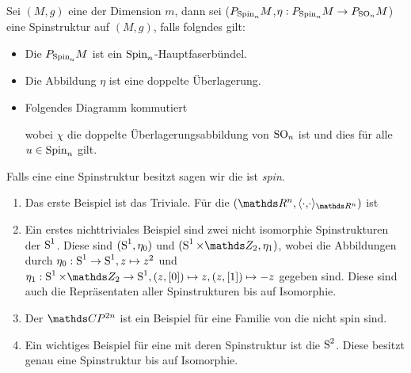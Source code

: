 \begin{Def}[Spinstruktur]
	Sei $(M,g)$ eine \RMF der Dimension $m$, dann sei
	 ($P_{\operatorname{Spin}_{ n }}M$,$\eta : P_{\operatorname{Spin}_{ n }}M \rightarrow P_{\operatorname{SO}_{ n }}M$) eine Spinstruktur auf $(M,g)$, falls folgndes gilt:
	 \begin{itemize}
	 	\item Die \mfg $P_{\operatorname{Spin}_{ n }}M$ ist ein $\operatorname{Spin}_{ n }$-Hauptfaserbündel.
	 	\item Die Abbildung $\eta$ ist eine doppelte Überlagerung.
	 	\item Folgendes Diagramm kommutiert\\
		 	\begin{center}
			 \end{center}
			wobei $\chi$ die doppelte Überlagerungsabbildung von $\operatorname{SO}_{ n }$ ist
			und dies für alle $u \in \operatorname{Spin}_{ n }$ gilt.
	 \end{itemize}
	 Falls eine \RMF eine Spinstruktur besitzt sagen wir die \mfg ist \textit{spin}.
	

\end{Def}

\begin{Bsp}
	\begin{enumerate}[(1)]
		\item Das erste Beispiel ist das Triviale. Für die \RMF $(\R^n, \scdots_{\R^n})$ ist 
		\item Ein erstes nichttriviales Beispiel sind zwei nicht
		isomorphie Spinstrukturen der $\operatorname{S}^1$. Diese sind $(\operatorname{S}^1 , \eta_0)$ und $(\Sp^1 \times \Z_2 , \eta_1)$, wobei die Abbildungen durch $\eta_0 : \operatorname{S}^1 \rightarrow \operatorname{S}^1 , z \mapsto z^2$ und $\eta_1 : \Sp^1 \times \Z_2 \rightarrow \Sp^1 , (z,[0]) \mapsto z , (z,[1]) \mapsto -z$ gegeben sind. Diese sind auch die Repräsentaten aller Spinstrukturen bis auf 
		Isomorphie. 
		\item Der $\CP^{2n}$ ist ein Beispiel für eine Familie von
		\RMFen die nicht spin sind. 
		\item Ein wichtiges Beispiel für eine \RMF mit deren Spinstruktur ist die $\operatorname{S}^2$. Diese
		besitzt genau eine Spinstruktur bis auf Isomorphie. 
	\end{enumerate}
\end{Bsp}

